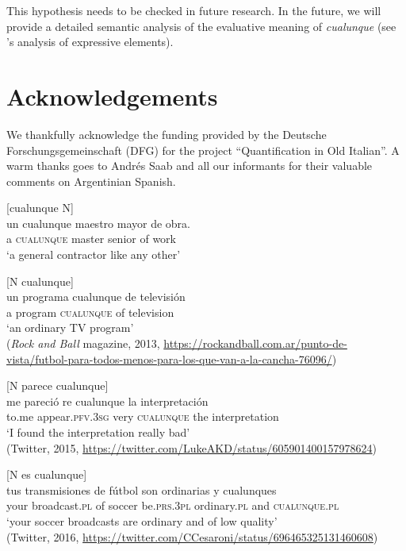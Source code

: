 \documentclass[output=paper,colorlinks,citecolor=brown]{langscibook}
\begin{document}
This hypothesis needs to be checked in future research. In the future, we will provide a detailed semantic analysis of the evaluative meaning of \textit{cualunque} (see \cite{Gutzmann2013}'s analysis of expressive elements).

\section*{Acknowledgements}\label{sec:fk8}
We thankfully acknowledge the funding provided by the Deutsche Forschungsgemeinschaft (DFG) for the project “Quantification in Old Italian”. A warm thanks goes to Andrés Saab and all our informants for their valuable comments on Argentinian Spanish. 

\label{sec:fk9.1}

\ea \label{ex:fk86}
    [cualunque N] \citep{Boot2012}\\
    \gll un cualunque maestro mayor de obra.\\
    a \textsc{cualunque} master senior of work\\
    \glt ‘a general contractor like any other’
    
    \ex \label{ex:fk87}
    [N cualunque]\\
    \gll un programa cualunque de televisión\\
    a program \textsc{cualunque} of television\\
    \glt ‘an ordinary TV program’\\
    (\textit{Rock and Ball} magazine, 2013, \url{https://rockandball.com.ar/punto-de-vista/futbol-para-todos-menos-para-los-que-van-a-la-cancha-76096/})
    
    \ex \label{ex:fk88}
    [N parece cualunque]\\
    \gll me pareció re cualunque la interpretación\\
    to.me appear.\textsc{pfv.3sg} very \textsc{cualunque} the interpretation\\
    \glt ‘I found the interpretation really bad’\\
    (Twitter, 2015, \url{https://twitter.com/LukeAKD/status/605901400157978624})
    
    \ex \label{ex:fk89}
    [N es cualunque]\\
    \gll tus transmisiones de fútbol son ordinarias y cualunques\\
    your broadcast.\textsc{pl} of soccer be.\textsc{prs.3pl} ordinary.\textsc{pl} and \textsc{cualunque}.\textsc{pl}\\
    \glt ‘your soccer broadcasts are ordinary and of low quality’\\
    (Twitter, 2016, \url{https://twitter.com/CCesaroni/status/696465325131460608})
    
\end{document}
